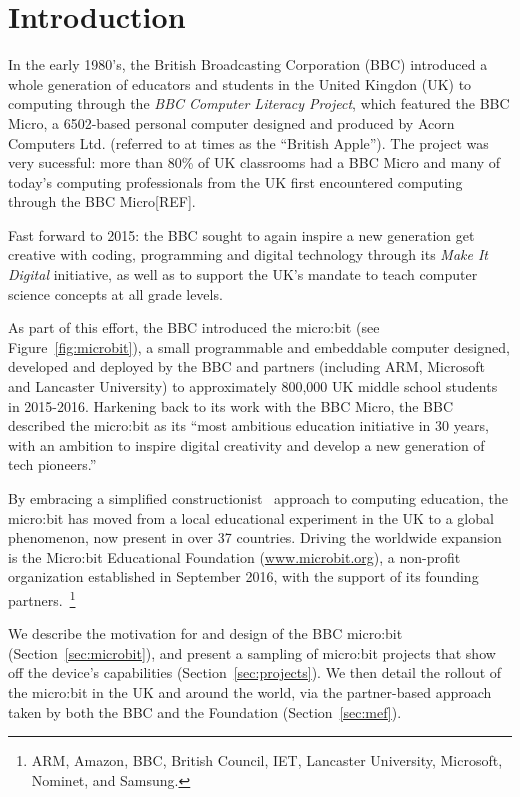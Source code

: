 \section{Introduction}
\label{sec:intrp}

In the early 1980's, the British Broadcasting Corporation (BBC)
introduced a whole generation of educators and students in the United Kingdon (UK)
to computing through the {\em BBC Computer Literacy Project}, which featured the BBC Micro,
a 6502-based personal computer designed and produced by Acorn Computers Ltd. (referred
to at times as the ``British Apple'').  The project was very sucessful:
more than 80\% of UK classrooms had a BBC Micro and many of today's
computing professionals from the UK first encountered computing through
the BBC Micro[REF].

Fast forward to 2015: the BBC sought to again inspire a new
generation get creative with coding, programming and digital technology
through its {\em Make It Digital} initiative, as well as to support the UK's mandate to
teach computer science concepts at all grade levels.~\cite{PeytonJones2013ICFP}

As part of this effort, the BBC introduced the micro:bit (see
Figure~\ref{fig:microbit}),
a small programmable and embeddable computer designed,
developed and deployed by the BBC and partners (including ARM, Microsoft
and Lancaster University) to approximately 800,000 UK middle school students
in 2015-2016. Harkening back to its work with the BBC Micro,
the BBC described the micro:bit as its ``most ambitious education initiative in 30 years,
with an ambition to inspire digital creativity and
develop a new generation of tech pioneers.''~\cite{BBCwebsite}

By embracing a simplified constructionist~\cite{Papert} approach to computing education, the micro:bit has moved from
a local educational experiment in the UK to a global phenomenon, now present in over 37 countries.
Driving the worldwide expansion is
the Micro:bit Educational Foundation (\url{www.microbit.org}),
a non-profit organization
established in September 2016, with the support of its founding partners.~\footnote{ARM,
Amazon, BBC, British Council, IET, Lancaster University, Microsoft,
Nominet, and Samsung.}

We describe the motivation for and design of the BBC micro:bit (Section~\ref{sec:microbit}),
and present a sampling of micro:bit projects that
show off the device's capabilities (Section~\ref{sec:projects}). We then detail
the rollout of the micro:bit in the UK and around the world, via the partner-based approach
taken by both the BBC and the Foundation (Section~\ref{sec:mef}).


